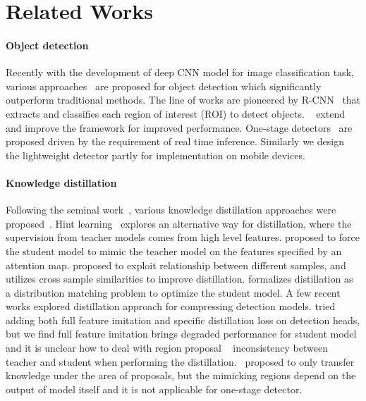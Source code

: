 \documentclass[10pt,twocolumn,letterpaper]{article}
\begin{document}
\section{Related Works}

\paragraph{Object detection} 
Recently with the development of deep CNN model for image classification task, various approaches~\cite{girshick2014rich, girshick2015fast, ren2015faster, cai2017cascade, redmon2016you, redmon2017yolo9000, liu2016ssd, lin2018focal} are proposed for object detection which significantly outperform traditional methods. The line of works are pioneered by R-CNN~\cite{girshick2014rich} that extracts and classifies each region of interest (ROI) to detect objects. ~\cite{girshick2015fast, ren2015faster} extend and improve the framework for improved performance. One-stage detectors~\cite{redmon2016you, liu2016ssd} are proposed driven by the requirement of real time inference. Similarly we design the lightweight detector partly for implementation on mobile devices.

\vspace{-4mm}
\paragraph{Knowledge distillation} Following the seminal work~\cite{hinton2015distilling}, various knowledge distillation approaches were proposed~\cite{romero2014fitnets,zagoruyko2016paying,chen2017darkrank, huang2017like}. Hint learning~\cite{romero2014fitnets} explores an alternative way for distillation, where the supervision from teacher models comes from high level features.   \cite{zagoruyko2016paying} proposed to force the student model to mimic the teacher model on the features specified by an attention map. 
\cite{chen2017darkrank} proposed to exploit relationship between different samples, and utilizes cross sample similarities to improve distillation. \cite{huang2017like} formalizes distillation as a distribution matching problem to optimize the student model. 
A few recent works explored distillation approach for compressing detection models. \cite{chen2017learning} tried adding both full feature imitation and specific distillation loss on detection heads, but we find full feature imitation brings degraded performance for student model and it is unclear how to deal with region proposal ~\cite{Girshick2015FastR} inconsistency between teacher and student when performing the distillation.~\cite{li2017mimicking} proposed to only transfer knowledge under the area of proposals, but the mimicking regions depend on the output of model itself and it is not applicable for one-stage detector.
\end{document}
